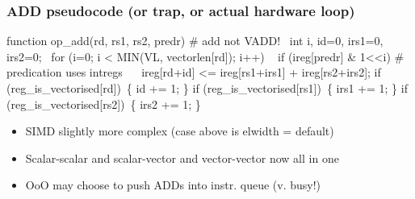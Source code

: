 \documentclass[slidestop]{beamer}
\begin{document}


\begin{frame}[fragile]
\frametitle{ADD pseudocode (or trap, or actual hardware loop)}

\begin{semiverbatim}
function op_add(rd, rs1, rs2, predr) # add not VADD!
  int i, id=0, irs1=0, irs2=0;
  for (i=0; i < MIN(VL, vectorlen[rd]); i++)
    if (ireg[predr] & 1<<i) # predication uses intregs
       ireg[rd+id] <= ireg[rs1+irs1] + ireg[rs2+irs2];
    if (reg_is_vectorised[rd]) \{ id += 1; \}
    if (reg_is_vectorised[rs1]) \{ irs1 += 1; \}
    if (reg_is_vectorised[rs2]) \{ irs2 += 1; \}
\end{semiverbatim}

  \begin{itemize}
   \item SIMD slightly more complex (case above is elwidth = default)
   \item Scalar-scalar and scalar-vector and vector-vector now all in one
   \item OoO may choose to push ADDs into instr. queue (v. busy!)
  \end{itemize}
\end{frame}
\end{document}

